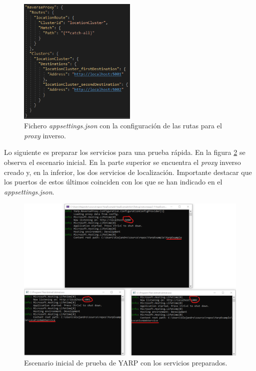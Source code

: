 \documentclass[11pt,spanish,listoffigures]{tfgetsinf}
\begin{document}
\begin{figure}[ht]
\centering
\includegraphics[width=0.5\textwidth]{imagenes/ejemploYARP/appsettings}
\caption{Fichero \emph{appsettings.json} con la configuración de las rutas para el \emph{proxy} inverso.}
	\label{ejemploYARP_appsettings}
\end{figure}

Lo siguiente es preparar los servicios para una prueba rápida. En la figura \ref{ejemploYARP_servicios_preparacion} se observa el escenario inicial. En la parte superior se encuentra el \emph{proxy} inverso creado y, en la inferior, los dos servicios de localización. Importante destacar que los puertos de estos últimos coinciden con los que se han indicado en el \emph{appsettings.json}.

\begin{figure}[ht]
\centering
\includegraphics[width=1\textwidth]{imagenes/ejemploYARP/servicios_preparacion}
\caption{Escenario inicial de prueba de YARP con los servicios preparados.}
	\label{ejemploYARP_servicios_preparacion}
\end{figure}
\end{document}
